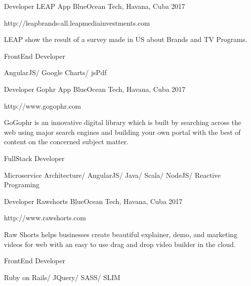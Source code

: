 \begin{cventries}

\cventry
{Developer} %
{LEAP App} %
{BlueOcean Tech, Havana, Cuba} %
{2017} %
{ %
\begin{cvitems}
\item {http://leapbrands-all.leapmediainvestments.com}
\item {LEAP show the result of a survey made in US about Brands and TV Programs.}
\item {FrontEnd Developer}
\item {AngularJS/ Google Charts/ jsPdf}
\end{cvitems}
}


\cventry
{Developer} %
{Gophr App} %
{BlueOcean Tech, Havana, Cuba} %
{2017} %
{ %
\begin{cvitems}
\item {http://www.gogophr.com}
\item {GoGophr is an innovative digital library which is built by searching across the web using major search engines and building your own portal with the best of content on the concerned subject matter.}
\item {FullStack Developer}
\item {Microservice Architecture/ AngularJS/ Java/ Scala/ NodeJS/ Reactive Programing}
\end{cvitems}
}


\cventry
{Developer} %
{Rawshorts} %
{BlueOcean Tech, Havana, Cuba} %
{2017} %
{ %
\begin{cvitems}
\item {http://www.rawshorts.com}
\item {Raw Shorts helps businesses create beautiful explainer, demo, and marketing videos for web with an easy to use drag and drop video builder in the cloud.}
\item {FrontEnd Developer}
\item {Ruby on Rails/ JQuery/ SASS/ SLIM}
\end{cvitems}
}

\end{cventries}

